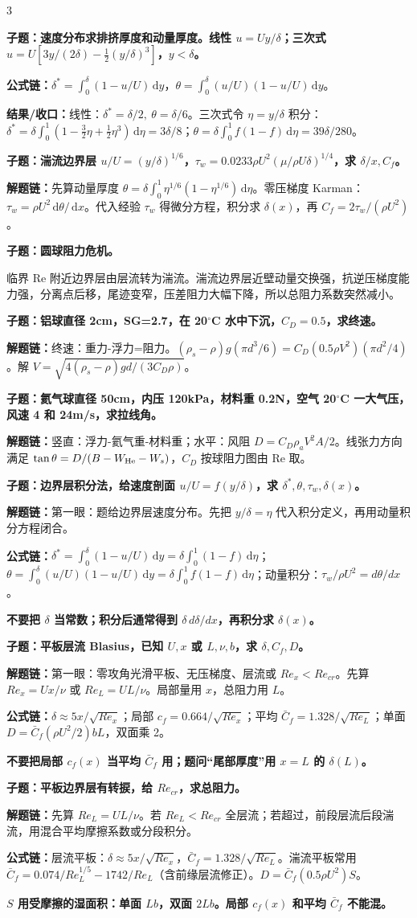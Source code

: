 \documentclass[a4paper]{article}
\newcommand{\qt}[1]{\vspace{0.25pt}\colorbox{Q}{\parbox{\dimexpr\linewidth-2\fboxsep}{\color{white}\bfseries #1}}\par}
\newcommand{\ans}[1]{\colorbox{G}{\parbox{\dimexpr\linewidth-2\fboxsep}{#1}}\par}
\newcommand{\warn}[1]{\colorbox{Y}{\parbox{\dimexpr\linewidth-2\fboxsep}{\color{E}\bfseries #1}}\par}
\newcommand{\chain}[1]{{\color{A}\bfseries 解题链：}#1\par}
\newcommand{\res}[1]{{\color{E}\bfseries 结果/收口：}#1\par}
\newcommand{\form}[1]{{\color{M}\bfseries 公式链：}#1\par}
\newcommand{\dd}{\,\mathrm d}
\begin{document}
\begin{multicols}{3}
\qt{子题：速度分布求排挤厚度和动量厚度。线性 $u=Uy/\delta$；三次式 $u=U[3y/(2\delta)-\frac12(y/\delta)^3]$，$y<\delta$。}
\form{$\delta^*=\int_0^\delta(1-u/U)\dd y$，$\theta=\int_0^\delta(u/U)(1-u/U)\dd y$。}
\res{线性：$\delta^*=\delta/2,\ \theta=\delta/6$。三次式令 $\eta=y/\delta$ 积分：$\delta^*=\delta\int_0^1(1-\frac32\eta+\frac12\eta^3)\dd\eta=3\delta/8$；$\theta=\delta\int_0^1 f(1-f)\dd\eta=39\delta/280$。}

\qt{子题：湍流边界层 $u/U=(y/\delta)^{1/6}$，$\tau_w=0.0233\rho U^2(\mu/\rho U\delta)^{1/4}$，求 $\delta/x,C_f$。}
\chain{先算动量厚度 $\theta=\delta\int_0^1\eta^{1/6}(1-\eta^{1/6})\dd\eta$。零压梯度 Karman：$\tau_w=\rho U^2\dd\theta/\dd x$。代入经验 $\tau_w$ 得微分方程，积分求 $\delta(x)$，再 $C_f=2\tau_w/(\rho U^2)$。}

\qt{子题：圆球阻力危机。}
\ans{临界 Re 附近边界层由层流转为湍流。湍流边界层近壁动量交换强，抗逆压梯度能力强，分离点后移，尾迹变窄，压差阻力大幅下降，所以总阻力系数突然减小。}

\qt{子题：铝球直径 2cm，SG=2.7，在 20$^\circ$C 水中下沉，$C_D=0.5$，求终速。}
\chain{终速：重力-浮力=阻力。$(\rho_s-\rho)g(\pi d^3/6)=C_D(0.5\rho V^2)(\pi d^2/4)$。解 $V=\sqrt{4(\rho_s-\rho)gd/(3C_D\rho)}$。}

\qt{子题：氦气球直径 50cm，内压 120kPa，材料重 0.2N，空气 20$^\circ$C 一大气压，风速 4 和 24m/s，求拉线角。}
\chain{竖直：浮力-氦气重-材料重；水平：风阻 $D=C_D\rho_aV^2A/2$。线张力方向满足 $\tan\theta=D/(B-W_{\rm He}-W_s)$，$C_D$ 按球阻力图由 Re 取。}

\qt{子题：边界层积分法，给速度剖面 $u/U=f(y/\delta)$，求 $\delta^*,\theta,\tau_w,\delta(x)$。}
\chain{第一眼：题给边界层速度分布。先把 $y/\delta=\eta$ 代入积分定义，再用动量积分方程闭合。}
\form{$\delta^*=\int_0^\delta(1-u/U)\dd y=\delta\int_0^1(1-f)\dd\eta$；$\theta=\int_0^\delta(u/U)(1-u/U)\dd y=\delta\int_0^1 f(1-f)\dd\eta$；动量积分：$\tau_w/\rho U^2=d\theta/dx$。}
\warn{不要把 $\delta$ 当常数；积分后通常得到 $\delta\,d\delta/dx$，再积分求 $\delta(x)$。}

\qt{子题：平板层流 Blasius，已知 $U,x$ 或 $L,\nu,b$，求 $\delta,C_f,D$。}
\chain{第一眼：零攻角光滑平板、无压梯度、层流或 $Re_x<Re_{cr}$。先算 $Re_x=Ux/\nu$ 或 $Re_L=UL/\nu$。局部量用 $x$，总阻力用 $L$。}
\form{$\delta\approx5x/\sqrt{Re_x}$；局部 $c_f=0.664/\sqrt{Re_x}$；平均 $\bar C_f=1.328/\sqrt{Re_L}$；单面 $D=\bar C_f(\rho U^2/2)bL$，双面乘 2。}
\warn{不要把局部 $c_f(x)$ 当平均 $\bar C_f$ 用；题问“尾部厚度”用 $x=L$ 的 $\delta(L)$。}

\qt{子题：平板边界层有转捩，给 $Re_{cr}$，求总阻力。}
\chain{先算 $Re_L=UL/\nu$。若 $Re_L<Re_{cr}$ 全层流；若超过，前段层流后段湍流，用混合平均摩擦系数或分段积分。}
\form{层流平板：$\delta\approx5x/\sqrt{Re_x}$，$\bar C_f=1.328/\sqrt{Re_L}$。湍流平板常用 $\bar C_f=0.074/Re_L^{1/5}-1742/Re_L$（含前缘层流修正）。$D=\bar C_f(0.5\rho U^2)S$。}
\warn{$S$ 用受摩擦的湿面积：单面 $Lb$，双面 $2Lb$。局部 $c_f(x)$ 和平均 $\bar C_f$ 不能混。}


\end{multicols}
\end{document}
